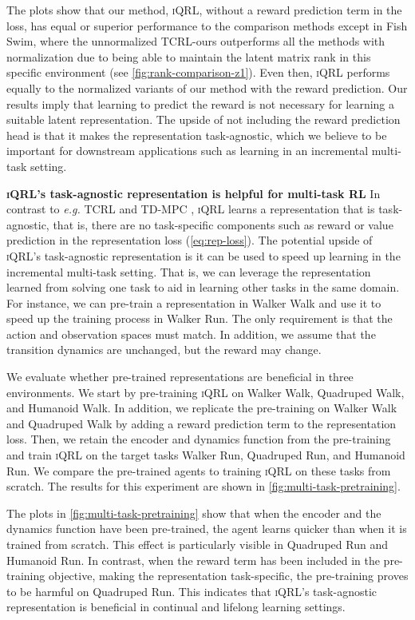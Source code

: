 \documentclass{article}
\makeatletter
\theoremstyle{plain}
\theoremstyle{definition}
\theoremstyle{remark}
\newcommand{\our}{\textsc{iQRL}\xspace}
\newcommand{\eg}{\textit{e.g.\@}\xspace}
\makeatother
\begin{document}
The plots show that our method, \our, without a reward prediction term in the loss, has equal or superior performance to the comparison methods except in Fish Swim, where the unnormalized TCRL-ours outperforms all the methods with normalization due to being able to maintain the latent matrix rank in this specific environment (see \cref{fig:rank-comparison-z1}). Even then, \our performs equally to the normalized variants of our method with the reward prediction. Our results imply that learning to predict the reward is not necessary for learning a suitable latent representation. The upside of not including the reward prediction head is that it makes the representation task-agnostic, which we believe to be important for downstream applications such as learning in an incremental multi-task setting.

\textbf{\our's task-agnostic representation is helpful for multi-task RL}
In contrast to \eg TCRL \cite{zhaoSimplifiedTemporalConsistency2023} and TD-MPC \cite{hansenTemporalDifferenceLearning2022}, \our learns a representation that is task-agnostic, that is, there are no task-specific components such as reward or value prediction in the representation loss (\cref{eq:rep-loss}). The potential upside of \our's task-agnostic representation is it can be used to speed up learning in the incremental multi-task setting. That is, we can leverage the representation learned from solving one task to aid in learning other tasks in the same domain. For instance, we can pre-train a representation in Walker Walk and use it to speed up the training process in Walker Run. The only requirement is that the action and observation spaces must match. In addition, we assume that the transition dynamics are unchanged, but the reward may change.

We evaluate whether pre-trained representations are beneficial in three environments. We start by pre-training \our on Walker Walk, Quadruped Walk, and Humanoid Walk. In addition, we replicate the pre-training on Walker Walk and Quadruped Walk by adding a reward prediction term to the representation loss. Then, we retain the encoder and dynamics function from the pre-training and train \our on the target tasks Walker Run, Quadruped Run, and Humanoid Run. We compare the pre-trained agents to training \our on these tasks from scratch. The results for this experiment are shown in \cref{fig:multi-task-pretraining}.

The plots in \cref{fig:multi-task-pretraining} show that when the encoder and the dynamics function have been pre-trained, the agent learns quicker than when it is trained from scratch. This effect is particularly visible in Quadruped Run and Humanoid Run. In contrast, when the reward term has been included in the pre-training objective, making the representation task-specific, the pre-training proves to be harmful on Quadruped Run. This indicates that \our's task-agnostic representation is beneficial in continual and lifelong learning settings.
\end{document}
